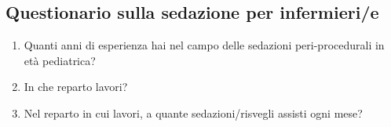 \begin{tcolorbox}[breakable,notitle,boxrule=0pt,colback=xkcdCloudyBlue!30,colframe=xkcdCloudyBlue!30]

\subsection*{Questionario sulla sedazione per infermieri/e}


\begin{enumerate}
           \item Quanti anni di esperienza hai nel campo delle sedazioni peri-procedurali in età pediatrica? 
           
           \item In che reparto lavori? \Qline{5cm}
           
           \item Nel reparto in cui lavori, a quante sedazioni/risvegli assisti ogni mese?
           

\end{enumerate}
\end{tcolorbox}
